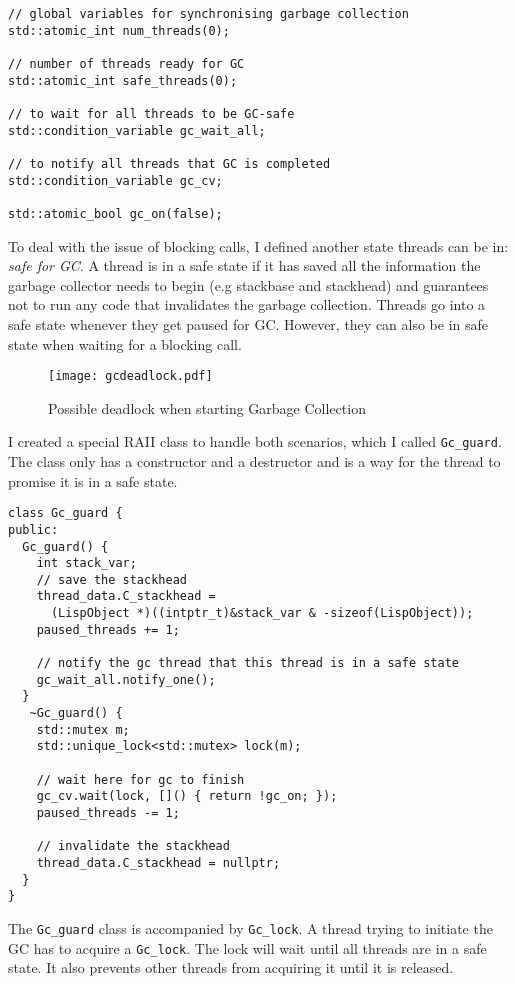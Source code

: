 \begin{verbatim}
// global variables for synchronising garbage collection
std::atomic_int num_threads(0);

// number of threads ready for GC
std::atomic_int safe_threads(0);

// to wait for all threads to be GC-safe
std::condition_variable gc_wait_all;

// to notify all threads that GC is completed
std::condition_variable gc_cv;

std::atomic_bool gc_on(false);
\end{verbatim}

To deal with the issue of blocking calls, I defined another state threads can be in: \emph{safe for GC}. A thread
is in a safe state if it has saved all the information the garbage collector needs to begin (e.g stackbase
and stackhead) and guarantees not to run any code that invalidates the garbage collection. Threads go into a safe
state whenever they get paused for GC. However, they can also be in safe state when waiting for a blocking call.

\begin{figure}[H]
  \centering
  \texttt{[image: gcdeadlock.pdf]}
  \label{fig:gcdeadlock}
  \caption{Possible deadlock when starting Garbage Collection}
\end{figure}

I created a special RAII class to handle both scenarios, which I called \texttt{Gc\_guard}. The class only has a constructor
and a destructor and is a way for the thread to promise it is in a safe state.

\begin{verbatim}
class Gc_guard {
public:
  Gc_guard() {
    int stack_var;
    // save the stackhead
    thread_data.C_stackhead =
      (LispObject *)((intptr_t)&stack_var & -sizeof(LispObject));
    paused_threads += 1;

    // notify the gc thread that this thread is in a safe state
    gc_wait_all.notify_one();
  }
   ~Gc_guard() {
    std::mutex m;
    std::unique_lock<std::mutex> lock(m);

    // wait here for gc to finish
    gc_cv.wait(lock, []() { return !gc_on; });
    paused_threads -= 1;

    // invalidate the stackhead
    thread_data.C_stackhead = nullptr;
  }
}
\end{verbatim}

The \texttt{Gc\_guard} class is accompanied by \texttt{Gc\_lock}. A thread trying to initiate the GC has to
acquire a \texttt{Gc\_lock}. The lock will wait until all threads are in a safe state. It also prevents
other threads from acquiring it until it is released.

